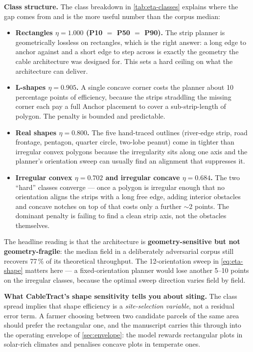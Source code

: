 \documentclass[11pt,a4paper]{article}
\begin{document}
\textbf{Class structure.} The class breakdown in \cref{tab:eta-classes} explains where the gap comes from and is the more useful number than the corpus median:
\begin{itemize}[leftmargin=1.6em,itemsep=0.15em]
    \item \textbf{Rectangles $\eta = 1.000$ (P10 $=$ P50 $=$ P90).} The strip planner is geometrically lossless on rectangles, which is the right answer: a long edge to anchor against and a short edge to step across is exactly the geometry the cable architecture was designed for. This sets a hard ceiling on what the architecture can deliver.
    \item \textbf{L-shapes $\eta = 0.905$.} A single concave corner costs the planner about 10 percentage points of efficiency, because the strips straddling the missing corner each pay a full Anchor placement to cover a sub-strip-length of polygon. The penalty is bounded and predictable.
    \item \textbf{Real shapes $\eta = 0.800$.} The five hand-traced outlines (river-edge strip, road frontage, pentagon, quarter circle, two-lobe peanut) come in tighter than irregular convex polygons because the irregularity sits along one axis and the planner's orientation sweep can usually find an alignment that suppresses it.
    \item \textbf{Irregular convex $\eta = 0.702$ and irregular concave $\eta = 0.684$.} The two ``hard'' classes converge --- once a polygon is irregular enough that no orientation aligns the strips with a long free edge, adding interior obstacles and concave notches on top of that costs only a further $\sim$2 points. The dominant penalty is failing to find a clean strip axis, not the obstacles themselves.
\end{itemize}
The headline reading is that the architecture is \textbf{geometry-sensitive but not geometry-fragile}: the median field in a deliberately adversarial corpus still recovers 77\,\% of its theoretical throughput. The 12-orientation sweep in \cref{eq:eta-shape} matters here --- a fixed-orientation planner would lose another 5--10 points on the irregular classes, because the optimal sweep direction varies field by field.

\textbf{What CableTract's shape sensitivity tells you about siting.} The class spread implies that shape efficiency is a \emph{site-selection variable}, not a residual error term. A farmer choosing between two candidate parcels of the same area should prefer the rectangular one, and the manuscript carries this through into the operating envelope of \cref{sec:envelope}: the model rewards rectangular plots in solar-rich climates and penalises concave plots in temperate ones.
\end{document}
